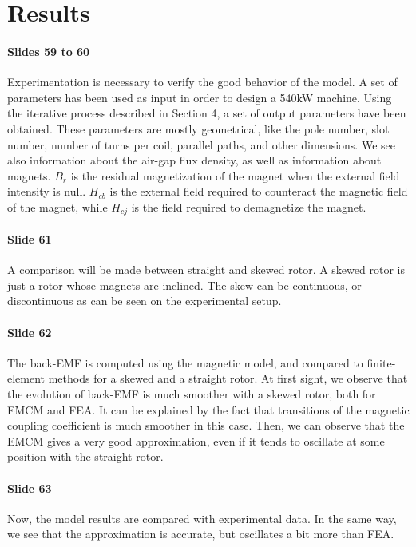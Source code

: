 \section{Results}

\paragraph{Slides 59 to 60} Experimentation is necessary to verify the good behavior of the model. A set of parameters has been used as input in order to design a 540kW machine. Using the iterative process described in Section 4, a set of output parameters have been obtained. These parameters are mostly geometrical, like the pole number, slot number, number of turns per coil, parallel paths, and other dimensions. We see also information about the air-gap flux density, as well as information about magnets. $B_r$ is the residual magnetization of the magnet when the external field intensity is null. $H_{cb}$ is the external field required to counteract the magnetic field of the magnet, while $H_{cj}$ is the field required to demagnetize the magnet.

\paragraph{Slide 61} A comparison will be made between straight and skewed rotor. A skewed rotor is just a rotor whose magnets are inclined. The skew can be continuous, or discontinuous as can  be seen on the experimental setup.

\paragraph{Slide 62} The back-EMF is computed using the magnetic model, and compared to finite-element methods for a skewed and a straight rotor. At first sight, we observe that the evolution of back-EMF is much smoother with a skewed rotor, both for EMCM and FEA. It can be explained by the fact that transitions of the magnetic coupling coefficient is much smoother in this case. Then, we can observe that the EMCM gives a very good approximation, even if it tends to oscillate at some position with the straight rotor.

\paragraph{Slide 63} Now, the model results are compared with experimental data. In the same way, we see that the approximation is accurate, but oscillates a bit more than FEA.

